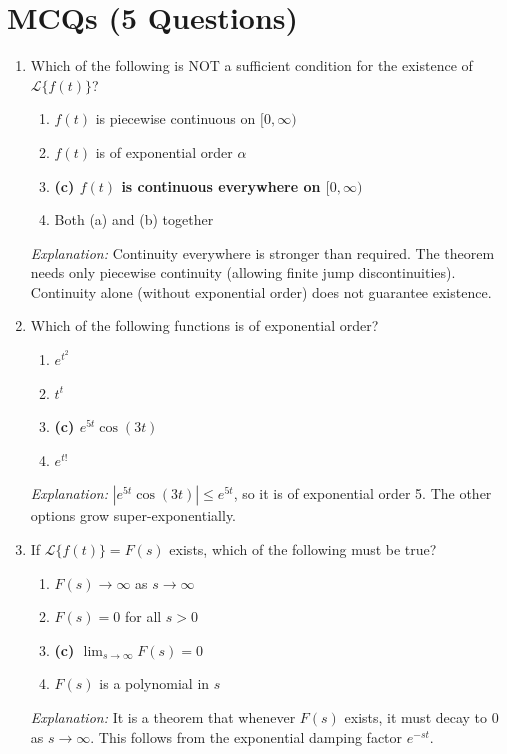 \documentclass[12pt,a4paper]{article}
\begin{document}
\section{MCQs (5 Questions)}

\begin{enumerate}[label=\textbf{MCQ \arabic*.}]

\item Which of the following is NOT a sufficient condition for the existence of $\mathcal{L}\{f(t)\}$?
\begin{enumerate}[label=(\alph*)]
  \item $f(t)$ is piecewise continuous on $[0,\infty)$
  \item $f(t)$ is of exponential order $\alpha$
  \item \textbf{(c) $f(t)$ is continuous everywhere on $[0,\infty)$}
  \item Both (a) and (b) together
\end{enumerate}
\textit{Explanation:} Continuity everywhere is stronger than required. The theorem needs only piecewise continuity (allowing finite jump discontinuities). Continuity alone (without exponential order) does not guarantee existence.

\item Which of the following functions is of exponential order?
\begin{enumerate}[label=(\alph*)]
  \item $e^{t^2}$
  \item $t^t$
  \item \textbf{(c) $e^{5t}\cos(3t)$}
  \item $e^{t!}$
\end{enumerate}
\textit{Explanation:} $|e^{5t}\cos(3t)| \leq e^{5t}$, so it is of exponential order 5. The other options grow super-exponentially.

\item If $\mathcal{L}\{f(t)\} = F(s)$ exists, which of the following must be true?
\begin{enumerate}[label=(\alph*)]
  \item $F(s) \to \infty$ as $s \to \infty$
  \item $F(s) = 0$ for all $s > 0$
  \item \textbf{(c) $\lim_{s \to \infty} F(s) = 0$}
  \item $F(s)$ is a polynomial in $s$
\end{enumerate}
\textit{Explanation:} It is a theorem that whenever $F(s)$ exists, it must decay to 0 as $s \to \infty$. This follows from the exponential damping factor $e^{-st}$.


\end{enumerate}
\end{document}
